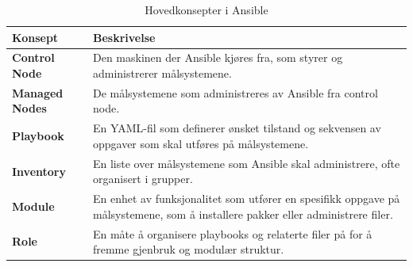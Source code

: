 \begin{table}[H]

\centering

\caption{Hovedkonsepter i Ansible}

\label{tab:ansible-konsepter}

\small

\renewcommand{\arraystretch}{1.25}

\begin{tabular}{@{}ll@{}}

\toprule

\parbox[t]{0.3\textwidth}{\textbf{Konsept}} & \parbox[t]{0.7\textwidth}{\textbf{Beskrivelse}} \\

\midrule

\parbox[t]{0.3\textwidth}{\footnotesize\textbf{Control Node}} & \parbox[t]{0.7\textwidth}{\raggedright Den maskinen der Ansible kjøres fra, som styrer og administrerer målsystemene.} \\

\addlinespace

\parbox[t]{0.3\textwidth}{\footnotesize\textbf{Managed Nodes}} & \parbox[t]{0.7\textwidth}{\raggedright De målsystemene som administreres av Ansible fra control node.} \\

\addlinespace

\parbox[t]{0.3\textwidth}{\footnotesize\textbf{Playbook}} & \parbox[t]{0.7\textwidth}{\raggedright En YAML-fil som definerer ønsket tilstand og sekvensen av oppgaver som skal utføres på målsystemene.} \\

\addlinespace

\parbox[t]{0.3\textwidth}{\footnotesize\textbf{Inventory}} & \parbox[t]{0.7\textwidth}{\raggedright En liste over målsystemene som Ansible skal administrere, ofte organisert i grupper.} \\

\addlinespace

\parbox[t]{0.3\textwidth}{\footnotesize\textbf{Module}} & \parbox[t]{0.7\textwidth}{\raggedright En enhet av funksjonalitet som utfører en spesifikk oppgave på målsystemene, som å installere pakker eller administrere filer.} \\

\addlinespace

\parbox[t]{0.3\textwidth}{\footnotesize\textbf{Role}} & \parbox[t]{0.7\textwidth}{\raggedright En måte å organisere playbooks og relaterte filer på for å fremme gjenbruk og modulær struktur.} \\

\bottomrule

\end{tabular}

\end{table}
